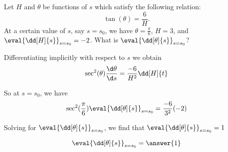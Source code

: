 \documentclass{ximera}
\author{Steven Gubkin}
\begin{document}
\begin{exercise}



Let $H$ and $\theta$ be functions of $s$ which satisfy the following relation:
\[
\tan(\theta) = \frac{6}{H}.
\]
At a certain value of $s$, say $s = s_0$, we have $\theta =
\frac{\pi}{6}$, $H=3$, and $\eval{\dd[H]{s}}_{s = s_0}
= -2$.  What is $\eval{\dd[\theta]{s}}_{s = s_0}$?
\end{exercise}

\begin{hint}
  Differentiating implicitly with respect to $s$ we obtain
\[
\sec^2(\theta) \frac{\d \theta}{\d s} = \frac{-6}{H^2} \dd[H]{t}
\]
\end{hint}

\begin{hint}
  So at $s  = s_0$, we have
\[
\sec^2(\frac{\pi}{6})\eval{\dd[\theta]{s}}_{s = s_0} = \frac{-6}{3^2}
(-2)
\]
\end{hint}

\begin{hint}
  Solving for $\eval{\dd[\theta]{s}}_{s = s_0}$, we find that
  $\eval{\dd[\theta]{s}}_{s = s_0} = 1$
\end{hint}

\begin{prompt}
  \[
  \eval{\dd[\theta]{s}}_{s = s_0} = \answer{1}
  \]
\end{prompt}
\end{document}
